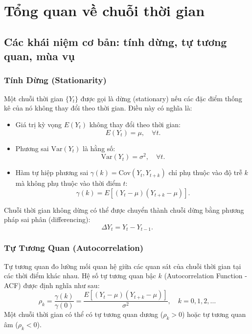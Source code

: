 \chapter{Tổng quan về chuỗi thời gian}
\section{Các khái niệm cơ bản: tính dừng, tự tương quan, mùa vụ}
\subsection{Tính Dừng (Stationarity)}
Một chuỗi thời gian $\{Y_t\}$ được gọi là dừng (stationary) nếu các đặc điểm thống kê của nó không thay đổi theo thời gian. Điều này có nghĩa là:
\begin{itemize}
    \item Giá trị kỳ vọng $E(Y_t)$ không thay đổi theo thời gian:
    \begin{equation}
        E(Y_t) = \mu, \quad \forall t.
    \end{equation}
    \item Phương sai $\text{Var}(Y_t)$ là hằng số:
    \begin{equation}
        \text{Var}(Y_t) = \sigma^2, \quad \forall t.
    \end{equation}
    \item Hàm tự hiệp phương sai $\gamma(k) = \text{Cov}(Y_t, Y_{t+k})$ chỉ phụ thuộc vào độ trễ $k$ mà không phụ thuộc vào thời điểm $t$:
    \begin{equation}
        \gamma(k) = E[(Y_t - \mu)(Y_{t+k} - \mu)].
    \end{equation}
\end{itemize}
Chuỗi thời gian không dừng có thể được chuyển thành chuỗi dừng bằng phương pháp sai phân (differencing):
\begin{equation}
    \Delta Y_t = Y_t - Y_{t-1}.
\end{equation}

\subsection{Tự Tương Quan (Autocorrelation)}
Tự tương quan đo lường mối quan hệ giữa các quan sát của chuỗi thời gian tại các thời điểm khác nhau. Hệ số tự tương quan bậc $k$ (Autocorrelation Function - ACF) được định nghĩa như sau:
\begin{equation}
    \rho_k = \frac{\gamma(k)}{\gamma(0)} = \frac{E[(Y_t - \mu)(Y_{t+k} - \mu)]}{\sigma^2}, \quad k = 0,1,2,\dots
\end{equation}
Một chuỗi thời gian có thể có tự tương quan dương ($\rho_k > 0$) hoặc tự tương quan âm ($\rho_k < 0$). 

